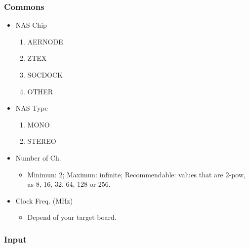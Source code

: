 \subsubsection{Commons}

\begin{itemize}
    \item NAS Chip
        \begin{enumerate}
            \item AERNODE
            \item ZTEX
            \item SOCDOCK
            \item OTHER
        \end{enumerate}
    \item NAS Type 
        \begin{enumerate}
            \item MONO
            \item STEREO
        \end{enumerate}
    \item Number of Ch.
        \begin{itemize}
            \item Minimun: 2; Maximun: infinite; Recommendable: values that are 2-pow, as 8, 16, 32, 64, 128 or 256.
        \end{itemize}
    \item Clock Freq. (MHz)
        \begin{itemize}
            \item Depend of your target board.
        \end{itemize}
\end{itemize}

\subsubsection{Input}

